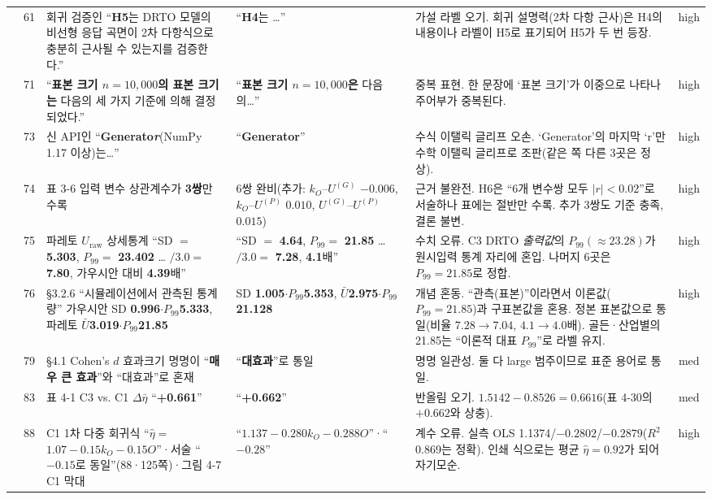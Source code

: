 \documentclass[11pt,a4paper]{article}
\newcommand{\err}[1]{{\color{errred}\textbf{#1}}}
\begin{document}
\begin{longtable}{@{}c c >{\RaggedRight}p{4.6cm} >{\RaggedRight}p{3.0cm} >{\RaggedRight}p{3.4cm} c@{}}
\addlinespace
10 & 61 & 회귀 검증인 ``\err{H5}는 DRTO 모델의 비선형 응답 곡면이 2차 다항식으로 충분히 근사될 수 있는지를 검증한다.'' & ``\err{H4}는 …'' & 가설 라벨 오기. 회귀 설명력(2차 다항 근사)은 H4의 내용이나 라벨이 H5로 표기되어 H5가 두 번 등장. & high \\
\addlinespace
11 & 71 & ``\err{표본 크기 $n=10{,}000$의 표본 크기는} 다음의 세 가지 기준에 의해 결정되었다.'' & ``\err{표본 크기 $n=10{,}000$은} 다음의…'' & 중복 표현. 한 문장에 `표본 크기'가 이중으로 나타나 주어부가 중복된다. & high \\
\addlinespace
12 & 73 & 신 API인 ``\err{Generato\textit{r}}(NumPy 1.17 이상)는…'' & ``\err{Generator}'' & 수식 이탤릭 글리프 오손. `Generator'의 마지막 `r'만 수학 이탤릭 글리프로 조판(같은 쪽 다른 3곳은 정상). & high \\
\addlinespace
13 & 74 & 표 3-6 입력 변수 상관계수가 \err{3쌍}만 수록 & 6쌍 완비(추가: $k_O$--$U^{(G)}$ $-0.006$, $k_O$--$U^{(P)}$ $0.010$, $U^{(G)}$--$U^{(P)}$ $0.015$) & 근거 불완전. H6은 ``6개 변수쌍 모두 $|r|<0.02$''로 서술하나 표에는 절반만 수록. 추가 3쌍도 기준 충족, 결론 불변. & high \\
\addlinespace
14 & 75 & 파레토 $U_{\mathrm{raw}}$ 상세통계 ``SD $=$ \err{5.303}, $P_{99}=$ \err{23.402} … $/3.0=$ \err{7.80}, 가우시안 대비 \err{4.39}배'' & ``SD $=$ \err{4.64}, $P_{99}=$ \err{21.85} … $/3.0=$ \err{7.28}, \err{4.1}배'' & 수치 오류. C3 DRTO \emph{출력값}의 $P_{99}(\approx 23.28)$가 원시입력 통계 자리에 혼입. 나머지 6곳은 $P_{99}=21.85$로 정합. & high \\
\addlinespace
15 & 76 & \S3.2.6 ``시뮬레이션에서 관측된 통계량'' 가우시안 SD \err{0.996}$\cdot P_{99}$\err{5.333}, 파레토 $\bar U$\err{3.019}$\cdot P_{99}$\err{21.85} & SD \err{1.005}$\cdot P_{99}$\err{5.353}, $\bar U$\err{2.975}$\cdot P_{99}$\err{21.128} & 개념 혼동. ``관측(표본)''이라면서 이론값($P_{99}{=}21.85$)과 구표본값을 혼용. 정본 표본값으로 통일(비율 $7.28{\to}7.04$, $4.1{\to}4.0$배). 골든·산업별의 21.85는 ``이론적 대표 $P_{99}$''로 라벨 유지. & high \\
\addlinespace
16 & 79 & \S4.1 Cohen's $d$ 효과크기 명명이 ``\err{매우 큰 효과}''와 ``대효과''로 혼재 & ``\err{대효과}''로 통일 & 명명 일관성. 둘 다 large 범주이므로 표준 용어로 통일. & med \\
\addlinespace
17 & 83 & 표 4-1 C3 vs. C1 $\Delta\bar\eta$ ``\err{+0.661}'' & ``\err{+0.662}'' & 반올림 오기. $1.5142-0.8526=0.6616$(표 4-30의 $+0.662$와 상충). & med \\
\addlinespace
18 & 88 & C1 1차 다중 회귀식 ``$\hat\eta=$ \err{$1.07-0.15k_O-0.15O$}''·서술 ``\err{$-0.15$}로 동일''(88·125쪽)·그림 4-7 C1 막대 & ``\err{$1.137-0.280k_O-0.288O$}''·``\err{$-0.28$}'' & 계수 오류. 실측 OLS 1.1374/$-0.2802$/$-0.2879$($R^2$ 0.869는 정확). 인쇄 식으로는 평균 $\hat\eta{=}0.92$가 되어 자기모순. & high \\

\end{longtable}
\end{document}

